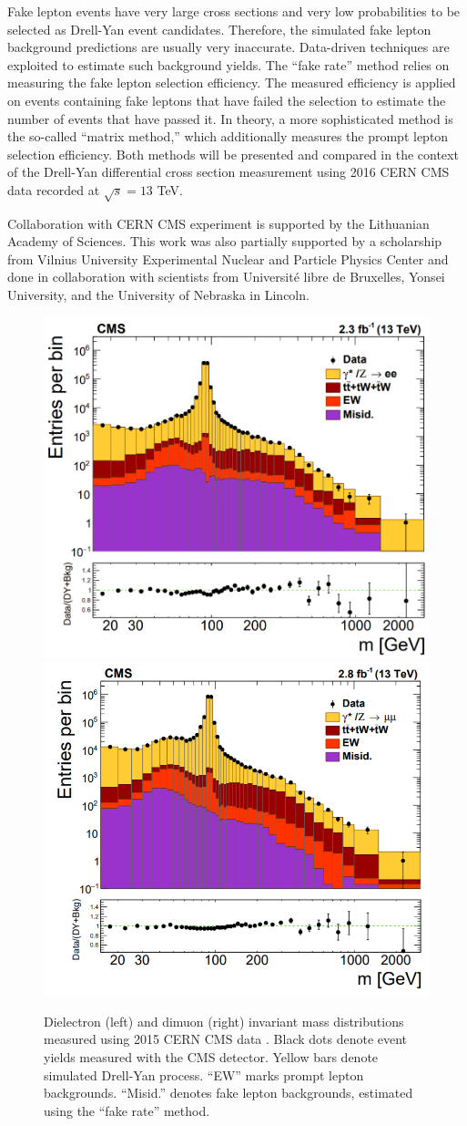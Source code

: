\documentclass[a4paper,10pt,english]{article}
\begin{document}
Fake lepton events have very large cross sections and very low probabilities to be selected as Drell-Yan event candidates.
Therefore, the simulated fake lepton background predictions are usually very inaccurate.
Data-driven techniques are exploited to estimate such background yields.
The ``fake rate'' method relies on measuring the fake lepton selection efficiency.
The measured efficiency is applied on events containing fake leptons that have failed the selection to estimate the number of
events that have passed it.
In theory, a more sophisticated method is the so-called ``matrix method,'' which additionally measures the prompt lepton selection efficiency.
Both methods will be presented and compared in the context of the Drell-Yan differential cross section measurement using
2016 CERN CMS data recorded at $\sqrt{s}=13$ TeV.

Collaboration with CERN CMS experiment is supported by the Lithuanian Academy of Sciences.
This work was also partially supported by a scholarship from Vilnius University Experimental Nuclear and Particle Physics Center and
done in collaboration with scientists from Universit\'{e} libre de Bruxelles, Yonsei University, and the University of Nebraska in Lincoln.
 
\vspace{-0.3cm}
\begin{figure}[H]
	\includegraphics[width=.33\linewidth]{Figure1.png}
	\includegraphics[width=.33\linewidth]{Figure2.png}
\vspace{-0.2cm}
\caption{Dielectron (left) and dimuon (right) invariant mass distributions measured using 2015 CERN CMS data \cite{DY13}.
      Black dots denote event yields measured with the CMS detector.    
      Yellow bars denote simulated Drell-Yan process.
      ``EW'' marks prompt lepton backgrounds.
      ``Misid.'' denotes fake lepton backgrounds, estimated using the ``fake rate'' method.}
\end{figure}
\end{document}
